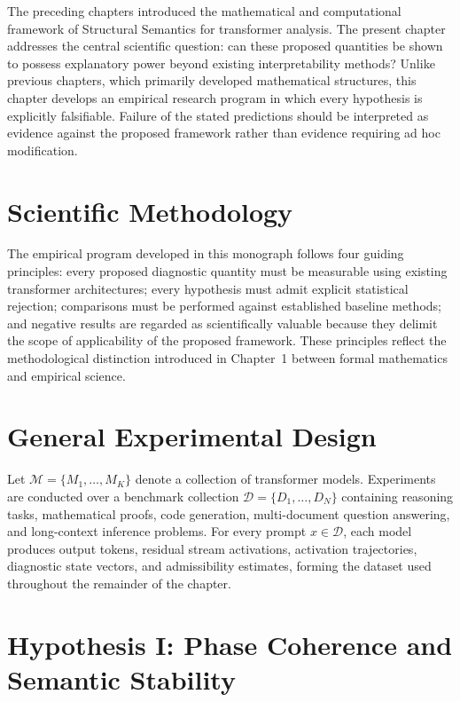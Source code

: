 \documentclass[11pt,twoside,openright]{book}
\numberwithin{equation}{chapter}
\theoremstyle{definition}
\theoremstyle{plain}
\theoremstyle{remark}
\theoremstyle{definition}
\begin{document}
The preceding chapters introduced the mathematical and computational
framework of Structural Semantics for transformer analysis. The present
chapter addresses the central scientific question: can these proposed
quantities be shown to possess explanatory power beyond existing
interpretability methods? Unlike previous chapters, which primarily
developed mathematical structures, this chapter develops an empirical
research program in which every hypothesis is explicitly falsifiable.
Failure of the stated predictions should be interpreted as evidence
against the proposed framework rather than evidence requiring ad hoc
modification.

\section{Scientific Methodology}

The empirical program developed in this monograph follows four guiding
principles: every proposed diagnostic quantity must be measurable using
existing transformer architectures; every hypothesis must admit explicit
statistical rejection; comparisons must be performed against established
baseline methods; and negative results are regarded as scientifically
valuable because they delimit the scope of applicability of the proposed
framework. These principles reflect the methodological distinction
introduced in Chapter~1 between formal mathematics and empirical science.

\section{General Experimental Design}

Let $\mathcal{M}=\{M_1,\ldots,M_K\}$ denote a collection of transformer
models. Experiments are conducted over a benchmark collection
$\mathcal{D}=\{D_1,\ldots,D_N\}$ containing reasoning tasks, mathematical
proofs, code generation, multi-document question answering, and
long-context inference problems. For every prompt $x\in\mathcal{D}$, each
model produces output tokens, residual stream activations, activation
trajectories, diagnostic state vectors, and admissibility estimates,
forming the dataset used throughout the remainder of the chapter.

\section{Hypothesis I: Phase Coherence and Semantic Stability}
\end{document}
